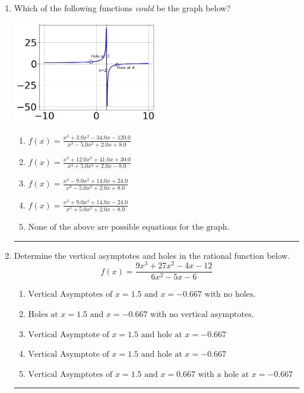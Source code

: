 \documentclass[14pt]{extbook}
\newcommand{\litem}[1]{\item#1\hspace*{-1cm}\rule{\textwidth}{0.4pt}}
\begin{document}
\begin{enumerate}
{\begin{enumerate}[label=\Alph*.]
\end{enumerate} }
\litem{
Which of the following functions \textit{could} be the graph below?
\begin{center}
    \includegraphics[width=0.5\textwidth]{../Figures/identifyGraphOfRationalFunctionC.png}
\end{center}
\begin{enumerate}[label=\Alph*.]
\item \( f(x)=\frac{x^{3} +3.0 x^{2} -34.0 x -120.0}{x^{3} -5.0 x^{2} +2.0 x + 8.0} \)
\item \( f(x)=\frac{x^{3} +12.0 x^{2} +41.0 x + 30.0}{x^{3} +5.0 x^{2} +2.0 x -8.0} \)
\item \( f(x)=\frac{x^{3} -9.0 x^{2} +14.0 x + 24.0}{x^{3} -5.0 x^{2} +2.0 x + 8.0} \)
\item \( f(x)=\frac{x^{3} +9.0 x^{2} +14.0 x -24.0}{x^{3} +5.0 x^{2} +2.0 x -8.0} \)
\item \( \text{None of the above are possible equations for the graph.} \)

\end{enumerate} }
\litem{
Determine the vertical asymptotes and holes in the rational function below.\[ f(x) = \frac{9x^{3} +27 x^{2} -4 x -12}{6x^{2} -5 x -6} \]\begin{enumerate}[label=\Alph*.]
\item \( \text{Vertical Asymptotes of } x = 1.5 \text{ and } x = -0.667 \text{ with no holes.} \)
\item \( \text{Holes at } x = 1.5 \text{ and } x = -0.667 \text{ with no vertical asymptotes.} \)
\item \( \text{Vertical Asymptote of } x = 1.5 \text{ and hole at } x = -0.667 \)
\item \( \text{Vertical Asymptote of } x = 1.5 \text{ and hole at } x = -0.667 \)
\item \( \text{Vertical Asymptotes of } x = 1.5 \text{ and } x = 0.667 \text{ with a hole at } x = -0.667 \)


\end{enumerate}}
\end{enumerate}
\end{document}
